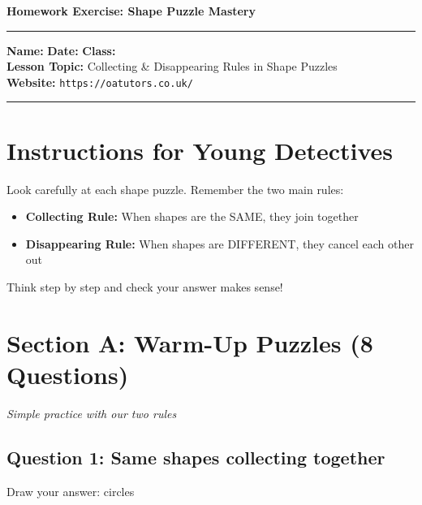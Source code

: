 \documentclass{article}
\begin{document}
\onehalfspacing

\begin{center}
\textbf{\Large Homework Exercise: Shape Puzzle Mastery}
\vspace{0.2cm}
\end{center}

\hrule
\vspace{0.1cm}

\textbf{Name:} \underline{\hspace{4cm}} \quad \textbf{Date:} \underline{\hspace{3cm}} \quad \textbf{Class:} \underline{\hspace{2cm}} \\
\textbf{Lesson Topic:} Collecting \& Disappearing Rules in Shape Puzzles \\
\textbf{Website:} \texttt{https://oatutors.co.uk/}

\vspace{0.2cm}
\hrule
\vspace{0.3cm}

\section*{Instructions for Young Detectives}
Look carefully at each shape puzzle. Remember the two main rules:
\begin{itemize}
    \item \textbf{Collecting Rule:} When shapes are the SAME, they join together
    \item \textbf{Disappearing Rule:} When shapes are DIFFERENT, they cancel each other out
\end{itemize}

Think step by step and check your answer makes sense!

\section{Section A: Warm-Up Puzzles (8 Questions)}
\textit{Simple practice with our two rules}

\subsection*{Question 1: Same shapes collecting together}
\begin{center}
\end{center}
Draw your answer: \underline{\hspace{4cm}} circles
\end{document}
